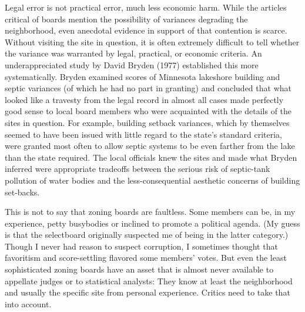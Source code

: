 Legal error is not practical error, much less economic harm. While the articles
critical of boards mention the possibility of variances degrading the
neighborhood, even anecdotal evidence in support of that contention is scarce.
Without visiting the site in question, it is often extremely difficult to tell
whether the variance was warranted by legal, practical, or economic criteria. An
underappreciated study by David Bryden (1977) established this more
systematically. Bryden examined scores of Minnesota lakeshore building and
septic variances (of which he had no part in granting) and concluded that what
looked like a travesty from the legal record in almost all cases made perfectly
good sense to local board members who were acquainted with the details of the
sites in question. For example, building setback variances, which by themselves
seemed to have been issued with little regard to the state's standard criteria,
were granted most often to allow septic systems to be even farther from the lake
than the state required. The local officials knew the sites and made what Bryden
inferred were appropriate tradeoffs between the serious risk of septic-tank
pollution of water bodies and the less-consequential aesthetic concerns of
building set-backs.

This is not to say that zoning boards are faultless. Some members can be, in my
experience, petty busybodies or inclined to promote a political agenda. (My
guess is that the selectboard originally suspected me of being in the latter
category.) Though I never had reason to suspect corruption, I sometimes thought
that favoritism and score-settling flavored some members' votes. But even the
least sophisticated zoning boards have an asset that is almost never available
to appellate judges or to statistical analysts: They know at least the
neighborhood and usually the specific site from personal experience. Critics
need to take that into account.


